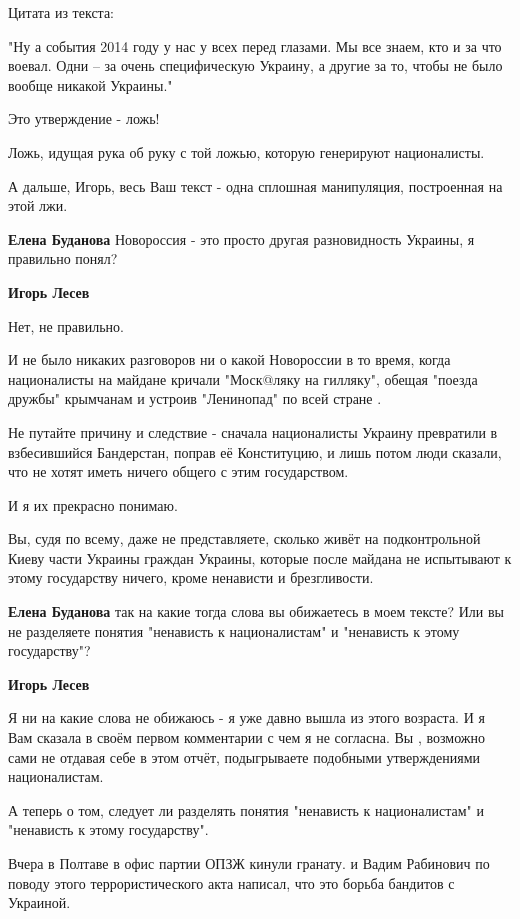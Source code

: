 \begin{itemize}
Цитата из текста:

"Ну а события 2014 году у нас у всех перед глазами. Мы все знаем, кто и за что
воевал. Одни – за очень специфическую Украину, а другие за то, чтобы не было
вообще никакой Украины."

Это утверждение - ложь!

Ложь, идущая рука об руку с той ложью, которую генерируют националисты.

А дальше, Игорь, весь Ваш текст - одна сплошная манипуляция, построенная на
этой лжи.

\begin{itemize} %
\textbf{Елена Буданова} Новороссия - это просто другая разновидность Украины, я правильно понял?

\textbf{Игорь Лесев} 

Нет, не правильно.

И не было никаких разговоров ни о какой Новороссии в то время, когда
националисты на майдане кричали "Моск@ляку на гилляку", обещая "поезда дружбы"
крымчанам и устроив "Ленинопад" по всей стране .

Не путайте причину и следствие - сначала националисты Украину превратили в
взбесившийся Бандерстан, поправ её Конституцию, и лишь потом люди сказали, что
не хотят иметь ничего общего с этим государством.

И я их прекрасно понимаю.

Вы, судя по всему, даже не представляете, сколько живёт на подконтрольной Киеву
части Украины граждан Украины, которые после майдана не испытывают к этому
государству ничего, кроме ненависти и брезгливости.


\textbf{Елена Буданова} так на какие тогда слова вы обижаетесь в моем тексте? Или вы не разделяете понятия "ненависть к националистам" и "ненависть к этому государству"?

\textbf{Игорь Лесев} 

Я ни на какие слова не обижаюсь - я уже давно вышла из этого возраста. И я Вам
сказала в своём первом комментарии с чем я не согласна. Вы , возможно сами не
отдавая себе в этом отчёт, подыгрываете подобными утверждениями националистам.

А теперь о том, следует ли разделять понятия "ненависть к националистам" и
"ненависть к этому государству".

Вчера в Полтаве в офис партии ОПЗЖ кинули гранату. и Вадим Рабинович по поводу
этого террористического акта написал, что это борьба бандитов с Украиной.


\end{itemize}
\end{itemize}
